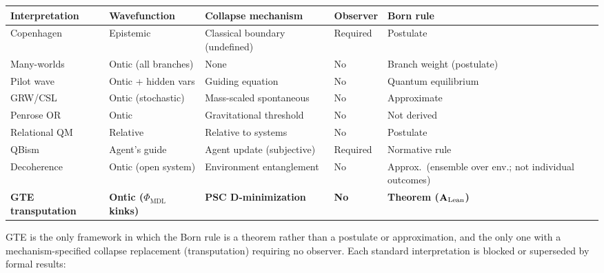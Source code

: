 \documentclass[11pt]{article}
\theoremstyle{remark}
\newcommand{\CatAL}{\ensuremath{\textbf{A}_{\rm Lean}}}
\begin{document}
\begin{center}
\footnotesize\setlength{\tabcolsep}{5pt}
\renewcommand{\arraystretch}{1.4}
\begin{tabular}{@{}>{\raggedright\arraybackslash}p{2.4cm}
                   >{\raggedright\arraybackslash}p{2.4cm}
                   >{\raggedright\arraybackslash}p{3.0cm}
                   >{\raggedright\arraybackslash}p{1.6cm}
                   >{\raggedright\arraybackslash}p{2.8cm}@{}}
\toprule
\textbf{Interpretation} & \textbf{Wavefunction} & \textbf{Collapse mechanism} &
\textbf{Observer} & \textbf{Born rule} \\
\midrule
Copenhagen~\cite{vonNeumann1955} & Epistemic & Classical boundary (undefined) & Required & Postulate \\[2pt]
Many-worlds & Ontic (all branches) & None & No & Branch weight (postulate) \\[2pt]
Pilot wave & Ontic + hidden vars & Guiding equation & No & Quantum equilibrium \\[2pt]
GRW/CSL & Ontic (stochastic) & Mass-scaled spontaneous & No & Approximate \\[2pt]
Penrose OR~\cite{Penrose1989} & Ontic & Gravitational threshold & No & Not derived \\[2pt]
Relational QM & Relative & Relative to systems & No & Postulate \\[2pt]
QBism & Agent's guide & Agent update (subjective) & Required & Normative rule \\[2pt]
Decoherence~\cite{Zurek2003} & Ontic (open system) & Environment entanglement & No & Approx.\ (ensemble over env.; not individual outcomes) \\[2pt]
\midrule
\textbf{GTE transputation} & \textbf{Ontic ($\Phi_\text{MDL}$ kinks)} &
\textbf{PSC D-minimization} & \textbf{No} & \textbf{Theorem (\CatAL)} \\
\bottomrule
\end{tabular}
\end{center}

\medskip
GTE is the only framework in which the Born rule is a theorem rather than a postulate
or approximation, and the only one with a mechanism-specified collapse replacement
(transputation) requiring no observer. Each standard interpretation is blocked or
superseded by formal results:
\end{document}
